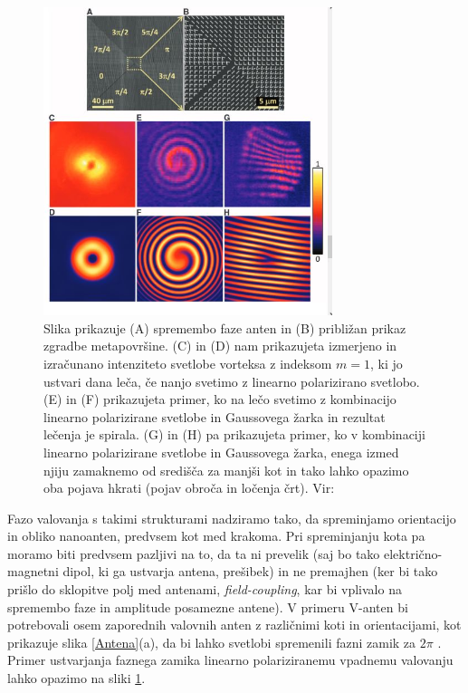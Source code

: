 \documentclass[12pt ]{article}
\begin{document}
\begin{figure}[H]
\centering
  \includegraphics[width=.7\linewidth, height=9cm]{Slike/Faza.JPG}
  \caption{Slika prikazuje (A) spremembo faze anten in (B) približan prikaz zgradbe metapovršine. (C) in (D) nam prikazujeta izmerjeno in izračunano intenziteto svetlobe vorteksa z indeksom $m=1$, ki jo ustvari dana leča, če nanjo svetimo z linearno polarizirano svetlobo. (E) in (F) prikazujeta primer, ko na lečo svetimo z kombinacijo linearno polarizirane svetlobe in Gaussovega žarka in rezultat lečenja je spirala. (G) in (H) pa prikazujeta primer, ko v kombinaciji linearno polarizirane svetlobe in Gaussovega žarka, enega izmed njiju zamaknemo od središča za manjši kot in tako lahko opazimo oba pojava hkrati (pojav obroča in ločenja črt).   Vir: \cite{Snell}  }
  \label{Faza}
\end{figure}

Fazo valovanja s takimi strukturami nadziramo tako, da  spreminjamo orientacijo in obliko nanoanten, predvsem kot med krakoma. Pri spreminjanju kota pa moramo biti predvsem pazljivi na to, da ta ni prevelik (saj bo tako električno-magnetni dipol, ki ga ustvarja antena, prešibek) in ne premajhen (ker bi tako prišlo do sklopitve polj med antenami, \textit{field-coupling}, kar bi vplivalo na spremembo faze in amplitude posamezne antene). V primeru V-anten bi potrebovali osem zaporednih valovnih anten z različnimi koti in orientacijami, kot prikazuje slika \ref{Antena}(a), da bi lahko svetlobi spremenili fazni zamik za $2\pi$ \cite{Antena}. Primer ustvarjanja faznega zamika linearno polariziranemu vpadnemu valovanju lahko opazimo na sliki \ref{Faza}. 
\end{document}
